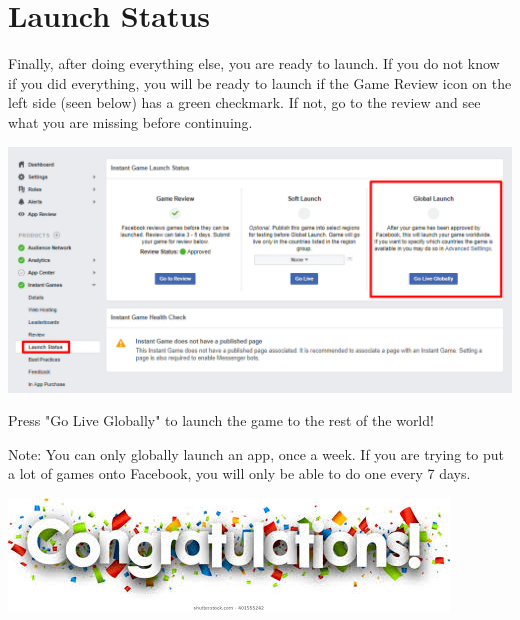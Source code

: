 \documentclass{article}
\begin{document}
\section{Launch Status}
Finally, after doing everything else, you are ready to launch. If you do not know if you did everything, you will be ready to launch if the Game Review icon on the left side (seen below) has a green checkmark. If not, go to the review and see what you are missing before continuing.

\begin{center}
\includegraphics[width=\textwidth]{images/launch.png}
\end{center}

Press "Go Live Globally" to launch the game to the rest of the world! 

Note: You can only globally launch an app, once a week. If you are trying to put a lot of games onto Facebook, you will only be able to do one every 7 days.
\vfill{}

\begin{center}
\includegraphics[width=\textwidth]{images/congratulations.jpg}
\end{center}
\end{document}
